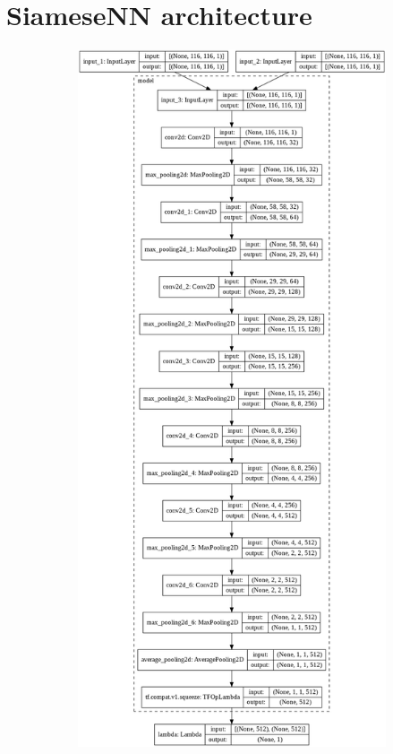 
\section{SiameseNN architecture}\label{apx:siamese-architecture}

\begin{figure}[ht!]
    \centering
    \begin{subfigure}[t]{0.5\linewidth}
        \includegraphics[width=\linewidth]{figures/model_plot_256d.png}

\end{subfigure}
\end{figure}
